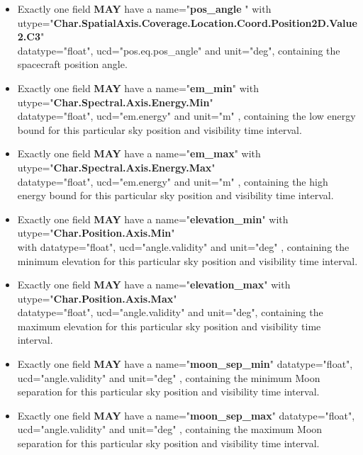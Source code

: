 \documentclass[11pt,a4paper]{ivoatex/ivoa}
\begin{document}
\begin{itemize}
\item {Exactly one field \textbf{MAY }have a name="\textbf{pos\_angle
}" with\\
utype="\textbf{Char.SpatialAxis.Coverage.Location.Coord.Position2D.Value2.C3}"\\
datatype="float", ucd="pos.eq.pos\_angle" and
unit="deg", containing the spacecraft position angle.}

\item {Exactly one field \textbf{MAY }have a name="\textbf{em\_min}" with\\
utype="\textbf{Char.Spectral.Axis.Energy.Min}"\\
datatype="float", ucd="em.energy" and unit="m" , containing the low energy bound for this particular sky position and visibility time interval.}

\item {Exactly one field \textbf{MAY }have a name="\textbf{em\_max}" with\\
utype="\textbf{Char.Spectral.Axis.Energy.Max}"\\
datatype="float", ucd="em.energy" and unit="m" , containing the high energy bound for this particular sky position and
visibility time interval.}

\item {Exactly one field \textbf{MAY }have a name="\textbf{elevation\_min}" with\\
utype="\textbf{Char.Position.Axis.Min}"\\ with
datatype="float", ucd="angle.validity" and unit="deg" , containing the minimum elevation for this particular sky position and visibility
time interval.}

\item {Exactly one field \textbf{MAY }have a name="\textbf{elevation\_max}" with\\
utype="\textbf{Char.Position.Axis.Max}"\\
datatype="float", ucd="angle.validity" and unit="deg", containing the maximum elevation for this particular sky position and 
visibility time interval.}

\item {Exactly one field \textbf{MAY }have a name="\textbf{moon\_sep\_min}" 
datatype="float", ucd="angle.validity" and
unit="deg" , containing the minimum Moon separation for this particular
sky position and visibility time interval.}

\item {Exactly one field \textbf{MAY }have a name="\textbf{moon\_sep\_max}" 
datatype="float", ucd="angle.validity" and
unit="deg" , containing the maximum Moon separation for this particular
sky position and visibility time interval.}


\end{itemize}
\end{document}
